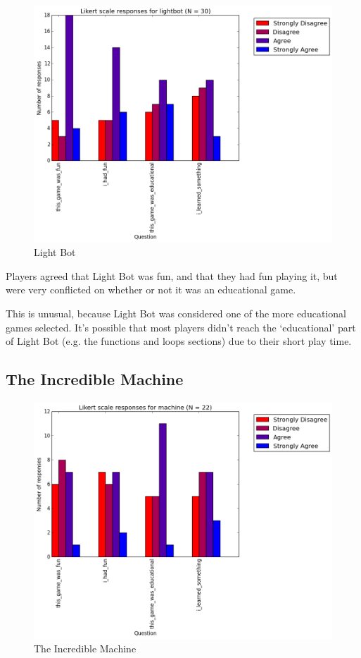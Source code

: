 				\begin{figure}[] 
				\centering 
				\includegraphics[width=\textwidth, height=.4\textheight, keepaspectratio=true]{lightbot_likert.png} 
				\caption{Light Bot}
				\end{figure}

				Players agreed that Light Bot was fun, and that they had fun playing it, but were very conflicted on whether or not it was an educational game. 

				This is unusual, because Light Bot was considered one of the more educational games selected. It's possible that most players didn't reach the `educational' part of Light Bot (e.g. the functions and loops sections) due to their short play time.

			\subsection{The Incredible Machine}

				\begin{figure}[] 
				\centering 
				\includegraphics[width=\textwidth, height=.4\textheight, keepaspectratio=true]{machine_likert.png} 
				\caption{The Incredible Machine}
				\end{figure}

